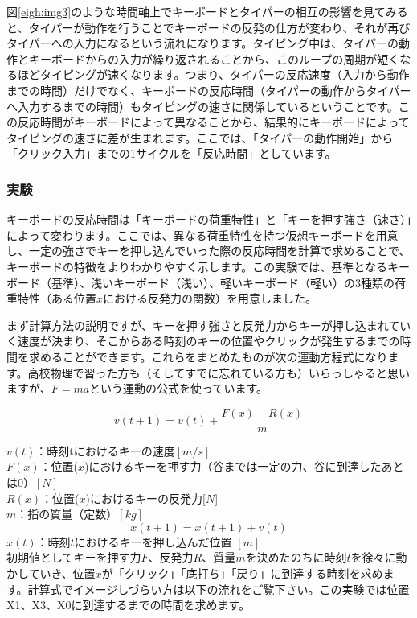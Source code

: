 図\ref{eigh:img3}のような時間軸上でキーボードとタイパーの相互の影響を見てみると、タイパーが動作を行うことでキーボードの反発の仕方が変わり、それが再びタイパーへの入力になるという流れになります。タイピング中は、タイパーの動作とキーボードからの入力が繰り返されることから、このループの周期が短くなるほどタイピングが速くなります。つまり、タイパーの反応速度（入力から動作までの時間）だけでなく、キーボードの反応時間（タイパーの動作からタイパーへ入力するまでの時間）もタイピングの速さに関係しているということです。この反応時間がキーボードによって異なることから、結果的にキーボードによってタイピングの速さに差が生まれます。ここでは、「タイパーの動作開始」から「クリック入力」までの1サイクルを「反応時間」としています。


\subsubsection*{実験}
キーボードの反応時間は「キーボードの荷重特性」と「キーを押す強さ（速さ）」によって変わります。ここでは、異なる荷重特性を持つ仮想キーボードを用意し、一定の強さでキーを押し込んでいった際の反応時間を計算で求めることで、キーボードの特徴をよりわかりやすく示します。この実験では、基準となるキーボード（基準）、浅いキーボード（浅い）、軽いキーボード（軽い）の3種類の荷重特性（ある位置$x$における反発力の関数）を用意しました。

まず計算方法の説明ですが、キーを押す強さと反発力からキーが押し込まれていく速度が決まり、そこからある時刻のキーの位置やクリックが発生するまでの時間を求めることができます。これらをまとめたものが次の運動方程式になります。高校物理で習った方も（そしてすでに忘れている方も）いらっしゃると思いますが、$F=ma$という運動の公式を使っています。

\[
v(t+1)= v(t) + \frac{F(x)-R(x)}{m}
\]

\noindent $v(t)$：時刻tにおけるキーの速度$[m/s]$ \\
\noindent $F(x)$：位置($x$)におけるキーを押す力（谷までは一定の力、谷に到達したあとは0）$[N]$ \\
\noindent $R(x)$：位置($x$)におけるキーの反発力$[N$] \\
\noindent $m$：指の質量（定数）$[kg]$ \\

\[
x(t+1) = x(t+1) + v(t)
\]
\noindent $x(t)$：時刻$t$におけるキーを押し込んだ位置 $[m]$
 \\

初期値としてキーを押す力$F$、反発力$R$、質量$m$を決めたのちに時刻$t$を徐々に動かしていき、位置$x$が「クリック」「底打ち」「戻り」に到達する時刻を求めます。計算式でイメージしづらい方は以下の流れをご覧下さい。この実験では位置X1、X3、X0に到達するまでの時間を求めます。


